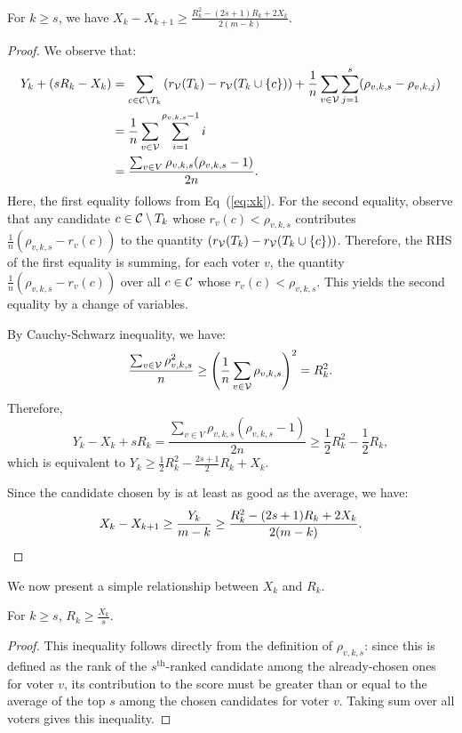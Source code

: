\begin{lemma}
\label{lem:sborda1}
For $k \geq s$, we have $X_k - X_{k + 1} \geq \frac{R_{k}^2 - (2s + 1)R_{k} + 2X_k}{2(m - k)}.$
\end{lemma}
\begin{proof}
We observe that:
\begin{align*}
Y_k + (sR_{k} - X_k) &= \sum_{c \in \mathcal{C} \setminus T_k} \left(r_{\mathcal{V}}(T_k) - r_{\mathcal{V}}(T_k \cup \{c\})\right) + \frac{1}{n}\sum_{v \in \mathcal{V}}\sum_{j = 1}^s (\rho_{v, k, s} - \rho_{v, k, j})\\
&= \frac{1}{n}\sum_{v \in \mathcal{V}}\sum_{i = 1}^{\rho_{v, k, s} - 1} i\\
&= \frac{\sum_{v \in V} \rho_{v, k, s}(\rho_{v, k, s} - 1)}{2n}.
\end{align*}
Here, the first equality follows from Eq~(\ref{eq:xk}). For the second equality, observe that any candidate $c \in \mathcal{C} \setminus T_k$ whose $r_v(c) < \rho_{v,k,s}$ contributes $\frac{1}{n} \left(\rho_{v,k,s} - r_v(c) \right)$ to the quantity $\left(r_{\mathcal{V}}(T_k) - r_{\mathcal{V}}(T_k \cup \{c\})\right)$. Therefore, the RHS of the first equality is summing, for each voter $v$, the quantity  $\frac{1}{n} \left(\rho_{v,k,s} - r_v(c) \right)$ over all $c \in \mathcal{C}$ whose $r_v(c) < \rho_{v,k,s}$. This yields the second equality by a change of variables.

By Cauchy-Schwarz inequality, we have:
\[
\frac{\sum_{v \in \mathcal{V}} \rho_{v, k, s}^2}{n} \geq \left(\frac{1}{n}\sum_{v\in \mathcal{V}} \rho_{v, k, s} \right)^2 = R_{k}^2.
\]
Therefore,
\[
Y_k - X_k + sR_{k} = \frac{\sum_{v \in V} \rho_{v, k, s}(\rho_{v, k, s} - 1)}{2n} \geq \frac{1}{2}R_{k}^2 - \frac{1}{2}R_{k},
\]
which is equivalent to $Y_k \geq \frac{1}{2}R_{k}^2 - \frac{2s + 1}{2}R_{k} + X_k.$

Since the candidate chosen by \g{} is at least as good as the average, we have:
\[
X_{k} - X_{k + 1} \geq \frac{Y_k}{m - k}\geq \frac{R_{k}^2 - (2s + 1)R_{k} + 2X_k}{2(m - k)}. \qedhere
\]
\end{proof}

We now present a simple relationship between $X_k$ and $R_{k}$.

\begin{lemma}
\label{lem:sborda2}
For $k \geq s$, $R_{k} \geq \frac{X_k}{s}.$
\end{lemma}
\begin{proof}
This inequality follows directly from the definition of $\rho_{v, k, s}$: since this is defined as the rank of the $s^{\text{th}}$-ranked candidate among the already-chosen ones for voter $v$, its contribution to the score must be greater than or equal to the average of the top $s$ among the chosen candidates for voter $v$. Taking sum over all voters gives this inequality.
\end{proof}

